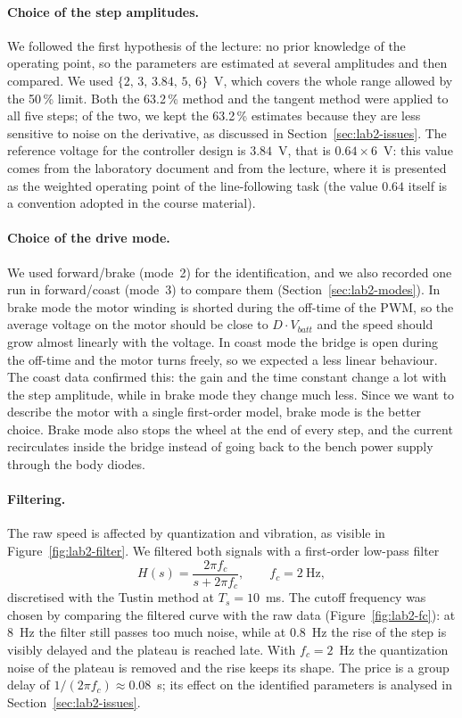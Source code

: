 \documentclass[english]{article}
\begin{document}
\paragraph{Choice of the step amplitudes.} We followed the first hypothesis of the lecture: no prior knowledge of the
operating point, so the parameters are estimated at several amplitudes and then compared. We used
$\{2,\,3,\,3.84,\,5,\,6\}$~V, which covers the whole range allowed by the 50\,\% limit. Both the 63.2\,\% method and
the tangent method were applied to all five steps; of the two, we kept the 63.2\,\% estimates because they are less
sensitive to noise on the derivative, as discussed in Section~\ref{sec:lab2-issues}. The reference voltage for the
controller design is $3.84$~V, that is $0.64\times6$~V: this value comes from the laboratory document and from the
lecture, where it is presented as the weighted operating point of the line-following task (the value $0.64$ itself is
a convention adopted in the course material).

\paragraph{Choice of the drive mode.} We used forward/brake (mode~2) for the identification, and we also recorded one
run in forward/coast (mode~3) to compare them (Section~\ref{sec:lab2-modes}). In brake mode the motor winding is
shorted during the off-time of the PWM, so the average voltage on the motor should be close to $D\cdot V_{batt}$ and
the speed should grow almost linearly with the voltage. In coast mode the bridge is open during the off-time and the
motor turns freely, so we expected a less linear behaviour. The coast data confirmed this: the gain and the time
constant change a lot with the step amplitude, while in brake mode they change much less. Since we want to describe
the motor with a single first-order model, brake mode is the better choice. Brake mode also stops the wheel at the
end of every step, and the current recirculates inside the bridge instead of going back to the bench power supply
through the body diodes.

\paragraph{Filtering.} The raw speed is affected by quantization and vibration, as visible in
Figure~\ref{fig:lab2-filter}. We filtered both signals with a first-order low-pass filter
\begin{equation}
  H(s) = \frac{2\pi f_c}{s+2\pi f_c}, \qquad f_c = 2~\text{Hz},
  \label{eq:lab2-filter}
\end{equation}
discretised with the Tustin method at $T_s=10$~ms. The cutoff frequency was chosen by comparing the filtered curve
with the raw data (Figure~\ref{fig:lab2-fc}): at 8~Hz the filter still passes too much noise, while at 0.8~Hz the
rise of the step is visibly delayed and the plateau is reached late. With $f_c=2$~Hz the quantization noise of the
plateau is removed and the rise keeps its shape. The price is a group delay of $1/(2\pi f_c)\approx0.08$~s; its
effect on the identified parameters is analysed in Section~\ref{sec:lab2-issues}.
\end{document}
